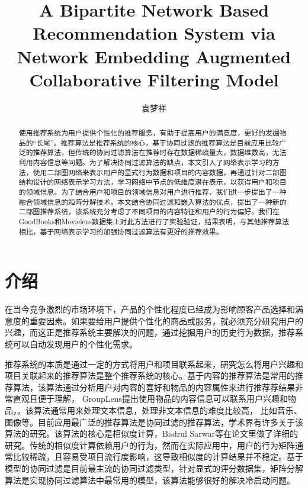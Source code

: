 \documentclass[lang=cn,11pt]{elegantpaper}
\title{A Bipartite Network Based Recommendation System via Network Embedding Augmented Collaborative Filtering Model }
\author{袁梦祥}
\institute{安徽大学大数据与云服务工程实验室}
\date{}
\begin{document}
\maketitle

\begin{abstract}
\noindent 使用推荐系统为用户提供个性化的推荐服务，有助于提高用户的满意度，更好的发掘物品的“长尾”。推荐算法是推荐系统的核心，基于协同过滤的推荐算法是目前应用比较广泛的推荐算法，但传统的协同过滤算法在推荐时存在数据稀疏量大，数据维数高，无法利用内容信息等问题。为了解决协同过滤算法的缺点，本文引入了网络表示学习的方法，使用二部图网络来表示用户的显式行为数据和项目的内容数据，再通过针对二部图结构设计的网络表示学习方法，学习网络中节点的低维度潜在表示，以获得用户和项目的领域信息。为了结合用户和项目的领域信息对用户进行推荐，我们进一步提出了一种融合领域信息的矩阵分解技术。本文结合协同过滤和嵌入算法的优点，提出了一种新的二部图推荐系统，该系统充分考虑了不同项目的内容特征和用户的行为偏好。我们在GoodBooks和Movielens数据集上对此方法进行了实验验证，结果表明，与其他推荐算法相比，基于网络表示学习的加强协同过滤算法有更好的推荐效果。
\end{abstract}


\section{介绍}

在当今竞争激烈的市场环境下，产品的个性化程度已经成为影响顾客产品选择和满意度的重要因素。如果要给用户提供个性化的商品或服务，就必须充分研究用户的兴趣，而这正是推荐系统主要解决的问题，通过挖掘用户的历史行为数据，推荐系统可以自动发现用户的个性化需求。

推荐系统的本质是通过一定的方式将用户和项目联系起来，研究怎么将用户兴趣和项目关联起来的推荐算法是整个推荐系统的核心。基于内容的推荐算法\cite{Balabanovic1997,Jannach2013,Meteren2000}是常用的推荐算法，该算法通过分析用户对内容的喜好和物品的内容属性来进行推荐荐结果非常直观且便于理解， GroupLens\cite{Vig2008}提出使用物品的内容信息可以联系用户兴趣和物品，。该算法通常用来处理文本信息\cite{Bhagavatula2018}，处理非文本信息的难度比较高， 比如音乐、图像等。目前应用最广泛的推荐算法是协同过滤的推荐算法，学术界有许多关于该算法的研究\cite{Linden2003,Miranda2009,Sarwar2001a,Su2009}。该算法的核心是相似度计算，Badrul Sarwar等在论文里做了详细的研究\cite{Sarwar2001}。传统的相似度计算依赖用户的行为，然而在实际应用中，用户的行为矩阵通常比较稀疏，且容易受项目流行度影响，这导致相似度的计算结果并不稳定。基于模型的协同过滤是目前最主流的协同过滤类型，针对显式的评分数据集，矩阵分解算法\cite{Salakhutdinov2007,Koren2009,Koren2008}是实现协同过滤算法中最常用的模型，该算法能够很好的解决冷启动问题\cite{Qiu2011}。
\end{document}
